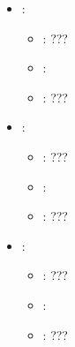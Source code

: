 \begin{itemize}
    \item {}:
           \begin{itemize}
                \item \optionPossibleValues{}: ???
                \item \optionDefaultValue{}: 
                \item \optionDescrption{}: ???
           \end{itemize}
    \item {}:
           \begin{itemize}
                \item \optionPossibleValues{}: ???
                \item \optionDefaultValue{}: 
                \item \optionDescrption{}: ???
           \end{itemize}
    \item {}:
           \begin{itemize}
                \item \optionPossibleValues{}: ???
                \item \optionDefaultValue{}: 
                \item \optionDescrption{}: ???
           \end{itemize}
\end{itemize}
